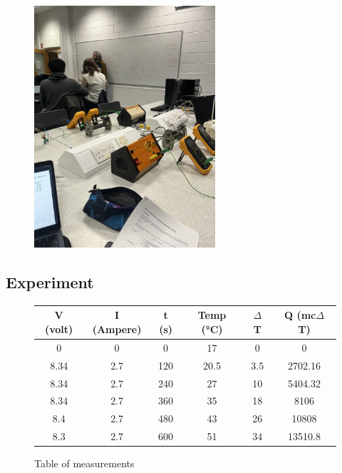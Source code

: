 \documentclass[a4paper]{article}
\begin{document}
\begin{figure}[H]
    \centering
    \includegraphics[width=0.6\textwidth]{IMG_5527.jpg}
\end{figure}


\subsection{Experiment}
\begin{figure}[H]
\centering
\begin{tabular}{c|c|c|c|c|c}
    \textbf{V (volt)} & \textbf{I (Ampere)} & \textbf{t (s)} & \textbf{Temp (°C)} & \textbf{$\Delta$ T} & \textbf{Q (mc$\Delta$ T)} \\
    \hline
    0 & 0 & 0 & 17 & 0 & 0\\
    8.34 & 2.7 & 120 & 20.5 & 3.5 & 2702.16\\
    8.34 & 2.7 & 240 & 27 & 10 & 5404.32\\
    8.34 & 2.7 & 360 & 35 & 18 & 8106 \\
    8.4 & 2.7 & 480 & 43 & 26 &  10808\\
    8.3 & 2.7 & 600 & 51 & 34 & 13510.8\\
\end{tabular}
\caption{Table of measurements}
\end{figure}
\end{document}
